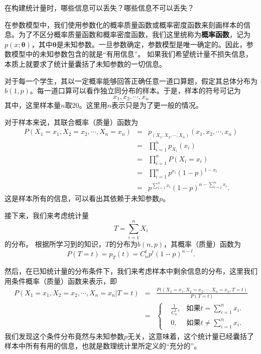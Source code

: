   \begin{problem}
 在构建统计量时，哪些信息可以丢失？哪些信息不可以丢失？
 \end{problem}
在参数模型中，我们使用参数化的概率质量函数或概率密度函数来刻画样本的信息。为了不区分概率质量函数和概率密度函数，我们这里统称为\textbf{概率函数}，记为$p(x;\bm{\theta})$，其中$\bm{\theta}$是未知参数。一旦参数确定，参数模型是唯一确定的。因此，参数模型中的未知参数包含的就是“有用信息”。
如果我们希望统计量不损失信息，本质上就要求了统计量囊括了未知参数的一切信息。  
      
\begin{example} 
  对于每一个学生，其以一定概率能够回答正确任意一道口算题，假定其总体分布为$b(1,p)$。每一道口算可以看作独立同分布的样本。于是，样本的符号可记为
  $$x_1,x_2,\cdots,x_n$$
  其中，这里样本量$n$取20。这里用$n$表示只是为了更一般的情况。
  
  对于样本来说，其联合概率（质量）函数为
  \begin{eqnarray*}
  	P(X_1 = x_1,X_2=x_2,\cdots,X_n=x_n) &=& p_{(X_1,X_2,\cdots,X_n)}(x_1,x_2,\cdots,x_n) \\
  	&=& \prod_{i=1}^n p_{X_i}(x_i) \\
  	&=& \prod_{i=1}^n P(X_i = x_i)\\ &=&\prod_{i=1}^n p^{x_i}(1-p)^{1-x_i}\\
  	&=& p^{\sum_{i=1}^n x_i} (1-p)^{n - \sum_{i=1}^n x_i}. 
  \end{eqnarray*}
这是样本所有的信息，可以看出其依赖于未知参数$p$。

接下来，我们来考虑统计量$$
T = \sum_{i=1}^n X_i
$$
的分布。
根据所学习到的知识，$T$的分布为$b(n,p)$，其概率（质量）函数为
$$
P(T = t) = p_T(t) = C_{n}^t p^{t} (1-p)^{n-t}.
$$

然后，在已知统计量的分布条件下，我们来考虑样本中剩余信息的分布，这里我们用条件概率（质量）函数来表示，即
\begin{eqnarray*}
	P(X_1=x_1,X_2 = x_2,\cdots,X_n = x_n | T = t) &=& \frac{P((X_1=x_1,X_2 = x_2,\cdots,X_n = x_n ,T = t)}{P(T=t)}\\
	&=&  \left\{
	\begin{aligned}
		&\frac{1}{C_{n}^t}, & \text{如果$t = \sum_{i=1}^n x_i$}.\\
		&0 , &  \text{如果$t \neq \sum_{i=1}^n x_i$}.
		\end{aligned}
	\right.
\end{eqnarray*}
我们发现这个条件分布竟然与未知参数$p$无关，这意味着，这个统计量已经囊括了样本中所有有用的信息，也就是数理统计里所定义的“充分的”。
\end{example}



